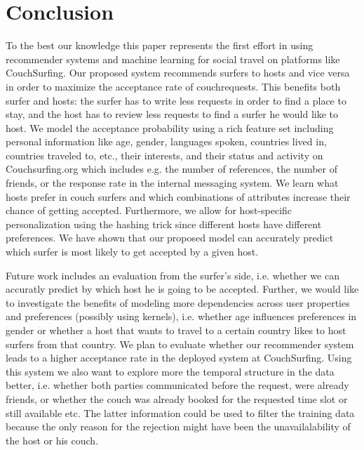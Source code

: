 \section{Conclusion}

To the best our knowledge this paper represents the first effort in using recommender systems and machine learning for social travel on platforms like CouchSurfing.
Our proposed system recommends surfers to hosts and vice versa in order to maximize the acceptance rate of couchrequests. This benefits both surfer and hosts: the surfer has to write less requests in order to find a place to
stay, and the host has to review less requests to find a surfer he would like to host.
We model the acceptance probability using a rich feature set including personal information like age, gender, languages spoken, countries lived in, countries traveled to, etc., their interests, and their status and activity on Couchsurfing.org which includes e.g. the number of references, the number of friends, or the response rate in the internal messaging system.
We learn what hosts prefer in couch surfers and which combinations of attributes increase their chance of getting accepted. Furthermore, we allow for host-specific personalization using the hashing trick since different hosts have 
different preferences.
We have shown that our proposed model can accurately predict which surfer is most likely to get accepted by a given host. 

Future work includes an evaluation from the surfer's side, i.e. whether we can accuratly predict by which host he is going to be accepted. Further, we would like to investigate the benefits of modeling more dependencies across user properties and preferences (possibly using kernels), i.e. whether age influences preferences in gender or whether a host that wants to travel to a certain country likes to host surfers from that country. We plan to evaluate whether our recommender system leads to a higher acceptance rate in the deployed system at CouchSurfing. Using this system we also want to explore more the temporal structure in the data better, i.e. whether both parties communicated before the request, were already friends, or whether the couch was already booked for the requested time slot or still available etc. The latter information could be used to filter the training data because the only reason for the rejection might have been the unavailalability of the host or his couch.
